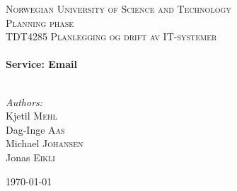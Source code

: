 
\begin{titlepage}

\begin{center}
 

\textsc{\LARGE Norwegian University of Science and Technology}\\[1.5cm]

 
\textsc{\Large Planning phase}\\[0.5cm]

\textsc{\large TDT4285 Planlegging og drift av IT-systemer}\\[0.5cm]
 
 
\HRule \\[0.4cm]
{ \huge \bfseries Service: Email}\\[0.4cm]
 
\HRule \\[1.5cm]
 

\begin{center} \Large
\emph{Authors:}\\
Kjetil \textsc{Mehl}\\
Dag-Inge \textsc{Aas}\\
Michael \textsc{Johansen}\\
Jonas \textsc{Eikli}\\[3cm]
\end{center}
 

{\large \today}\\[4cm] %
 
\vfill
\end{center}

\end{titlepage}
